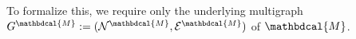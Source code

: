 \documentclass{article}
\theoremstyle{plain}
\theoremstyle{definition}
\theoremstyle{remark}
\newcommand{\todo}[1]{{\color{red}\ \!\Large\smash{\textbf{[}}{\normalsize\textsc{todo:} #1}\ \!\smash{\textbf{]}}}}
\newcommand{\N}{\mathcal N}
\newcommand{\Ed}{\mathcal E}
\newcommand{\dg}[1]{\mathbdcal{#1}}
\numberwithin{equation}{section}
\begin{document}
To formalize this, we require only the underlying multigraph $G^{\dg M} :=
(\N^{\dg M}, \Ed^{\dg M})$ of $\dg M$. 
\end{document}
